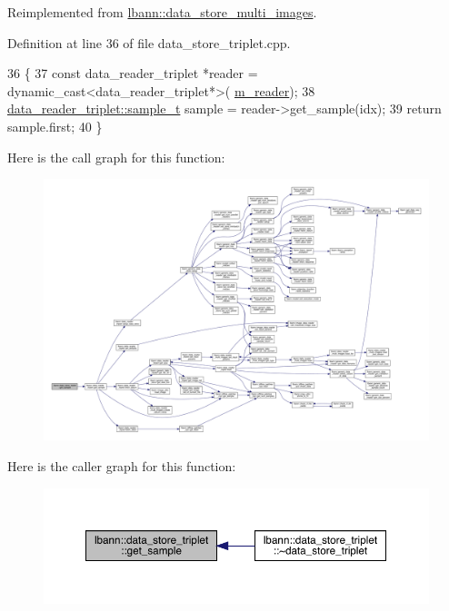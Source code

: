 Reimplemented from \hyperlink{classlbann_1_1data__store__multi__images_a39108690484fe407efafefe6a4b0947b}{lbann\+::data\+\_\+store\+\_\+multi\+\_\+images}.



Definition at line 36 of file data\+\_\+store\+\_\+triplet.\+cpp.


\begin{DoxyCode}
36                                                                     \{
37   \textcolor{keyword}{const} data\_reader\_triplet *reader = \textcolor{keyword}{dynamic\_cast<}data\_reader\_triplet*\textcolor{keyword}{>}(
      \hyperlink{classlbann_1_1generic__data__store_afa49ced0ab64c632371ea52532a91ec2}{m\_reader});
38   \hyperlink{classlbann_1_1data__reader__triplet_adddc55e0424d38b60ac5f55c16990bb7}{data\_reader\_triplet::sample\_t} sample = reader->get\_sample(idx);
39   \textcolor{keywordflow}{return} sample.first;
40 \}
\end{DoxyCode}
Here is the call graph for this function\+:\nopagebreak
\begin{figure}[H]
\begin{center}
\leavevmode
\includegraphics[width=350pt]{classlbann_1_1data__store__triplet_ade5d2290c85e7916e828553f4ab4f379_cgraph}
\end{center}
\end{figure}
Here is the caller graph for this function\+:\nopagebreak
\begin{figure}[H]
\begin{center}
\leavevmode
\includegraphics[width=350pt]{classlbann_1_1data__store__triplet_ade5d2290c85e7916e828553f4ab4f379_icgraph}
\end{center}
\end{figure}
\mbox{\label{classlbann_1_1data__store__triplet_a0ed814d64a7b664ef9646186c4642098}} 
